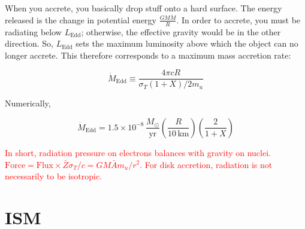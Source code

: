 \documentclass[12pt, letterpaper, preprint]{aastex}
\newcommand{\ledd}{L_{\mathrm{Edd}}}
\newcommand{\medd}{\dot{M}_{\mathrm{Edd}}}
\begin{document}
\begin{enumerate}
When you accrete, you basically drop stuff onto a hard surface. The energy released is the change in potential energy $ \frac{G M \dot{M} }{R} $. In order to accrete, you must be radiating below $\ledd$; otherwise, the effective gravity would be in the other direction. So, $\ledd$ sets the maximum luminosity above which the object can no longer accrete. This therefore corresponds to a maximum mass accretion rate:

\begin{equation}
\medd \equiv \frac{4 \pi c R}{\sigma_T (1 + X) / 2 m_u}
\end{equation}

Numerically,

$$ \medd = 1.5 \times 10^{-8} \, \frac{M_\odot}{\mathrm{yr}} \left( \frac{R}{10\,\mathrm{km}} \right) \left( \frac{2}{1+X} \right) $$

\textcolor{red}{In short, radiation pressure on electrons balances with gravity on nuclei. $\mathrm{Force}=\mathrm{Flux} \times \bar{Z}\sigma_{T}/c=GM \bar{A}m_u/r^2$. For disk accretion, radiation is not necessarily to be isotropic. }

\end{enumerate}

\newpage

\section*{ISM}
\end{document}
